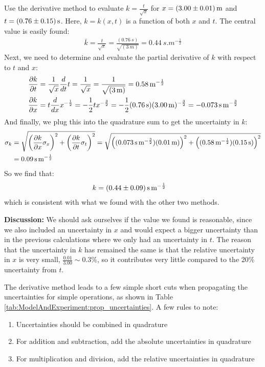 \begin{example}{Use the derivative method to evaluate $k=\frac{t}{\sqrt{x}}$ for $x=\SI{3.00 \pm 0.01}{m}$ and $t=\SI{0.76\pm0.15}{s}$.}
\label{ex:ModelAndExperiment:derivprop}
Here, $k=k(x,t)$ is a function of both $x$ and $t$. The central value is easily found:
\begin{align*}
\bar k = \frac{t}{\sqrt{x}} = \frac{(\SI{0.76}{s})}{\sqrt{(\SI{3}{m})}}=\SI{0.44}{s.m^{-\frac{1}{2}}}\end{align*}
Next, we need to determine and evaluate the partial derivative of $k$ with respect to $t$ and $x$:
\begin{align*}
\frac{\partial k}{\partial t}&=\frac{1}{\sqrt{x}}\frac{d}{dt}t=\frac{1}{\sqrt{x}}=\frac{1}{\sqrt{(\SI{3}{m})}}=\SI{0.58}{m^{-\frac{1}{2}}}\\
\frac{\partial k}{\partial x}&=t\frac{d}{dx}x^{-\frac{1}{2}}=-\frac{1}{2}tx^{-\frac{3}{2}}= -\frac{1}{2}(\SI{0.76}{s})(\SI{3.00}{m})^{-\frac{3}{2}}=-\SI{0.073}{s.m^{-\frac{3}{2}}}
\end{align*}
And finally, we plug this into the quadrature sum to get the uncertainty in $k$:
\begin{align*}
\sigma_k&=\sqrt{\left(\frac{\partial k}{\partial x}\sigma_x \right)^2 + \left(\frac{\partial k}{\partial t}\sigma_t \right)^2 } = \sqrt{\left((\SI{0.073}{s.m^{-\frac{3}{2}}}) (\SI{0.01}{m}) \right)^2 + \left((\SI{0.58}{m^{-\frac{1}{2}}})(\SI{0.15}{s}) \right)^2 } \\
&=\SI{0.09}{s.m^{-\frac{1}{2}}}
\end{align*}
So we find that:
\begin{align*}
k&= \SI{0.44 \pm 0.09}{s.m^{-\frac{1}{2}}}
\end{align*}
which is consistent with what we found with the other two methods.

\textbf{Discussion:} We should ask ourselves if the value we found is reasonable, since we also included an uncertainty in $x$ and would expect a bigger uncertainty than in the previous calculations where we only had an uncertainty in $t$. The reason that the uncertainty in $k$ has remained the same is that the relative uncertainty in $x$ is very small, $\frac{0.01}{3.00}\sim 0.3\%$, so it contributes very little compared to the 20\% uncertainty from $t$. 
\end{example}

The derivative method leads to a few simple short cuts when propagating the uncertainties for simple operations, as shown in Table \ref{tab:ModelAndExperiment:prop_uncertainties}. A few rules to note:
\begin{enumerate}
\item Uncertainties should be combined in quadrature
\item For addition and subtraction, add the absolute uncertainties in quadrature
\item For multiplication and division, add the relative uncertainties in quadrature
\end{enumerate}

